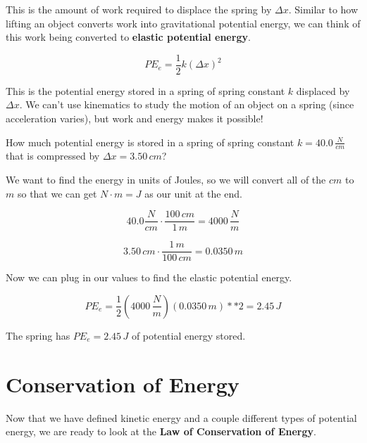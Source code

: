 \documentclass[12pt]{book}
\begin{document}
This is the amount of work required to displace the spring by $\Delta x$. Similar to how lifting an object converts work into gravitational potential energy, we can think of this work being converted to \textbf{elastic potential energy}.

\begin{equation}
PE_e = \frac{1}{2} k (\Delta x)^2
\end{equation}

This is the potential energy stored in a spring of spring constant $k$ displaced by $\Delta x$. We can't use kinematics to study the motion of an object on a spring (since acceleration varies), but work and energy makes it possible!

\begin{exampleblock}

How much potential energy is stored in a spring of spring constant $k = 40.0 \, \frac{N}{cm}$ that is compressed by $\Delta x = 3.50 \, cm$? 

\hspace{10pt}

We want to find the energy in units of Joules, so we will convert all of the $cm$ to $m$ so that we can get $N \cdot m = J$ as our unit at the end.

\begin{equation}
40.0 \frac{N}{cm} \cdot \frac{100 \, cm}{1 \, m} = 4000 \, \frac{N}{m}
\end{equation}

\begin{equation}
3.50 \, cm	\cdot \frac{1 \, m}{100 \, cm} = 0.0350 \, m
\end{equation}

Now we can plug in our values to find the elastic potential energy.

\begin{equation}
PE_e = \frac{1}{2} (4000 \, \frac{N}{m}) (0.0350 \, m)**2 = 2.45 \, J
\end{equation}

The spring has $PE_e = 2.45 \, J$ of potential energy stored.

\end{exampleblock}

\section{Conservation of Energy} 

Now that we have defined kinetic energy and a couple different types of potential energy, we are ready to look at the \textbf{Law of Conservation of Energy}.
\end{document}
